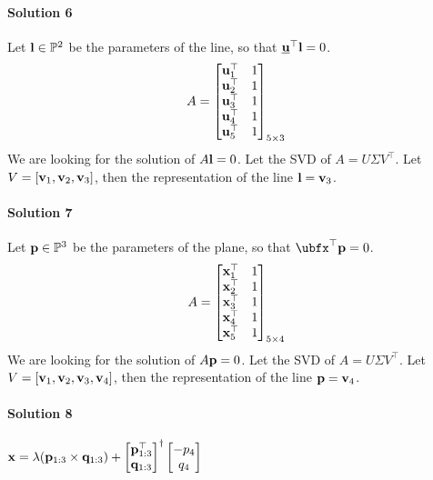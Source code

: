 \documentclass{article}
\begin{document}
\paragraph*{Solution 6}
Let $\mathbf{l} \in \mathbb{P}^2$  be the parameters of the line, so that $\underline{\mathbf{u}}^\top \mathbf{l} = 0$.
\begin{align*}
  A = \begin{bmatrix}
    \mathbf{u}_1^\top & 1 \\
    \mathbf{u}_2^\top & 1\\
    \mathbf{u}_3^\top & 1\\
    \mathbf{u}_4^\top & 1\\
    \mathbf{u}_5^\top & 1
    \end{bmatrix}_{5 \times 3}
\end{align*}
We are looking for the solution of $A \mathbf{l} = 0$.
Let the SVD of $A = U\Sigma V^\top$. Let $V = [\mathbf{v}_1, \mathbf{v}_2, \mathbf{v}_3]$, then
the representation of the line $\mathbf{l} = \mathbf{v}_3$.

\paragraph*{Solution 7}

Let $\mathbf{p} \in \mathbb{P}^3$  be the parameters of the plane, so that $\ubfx^\top \bfp = 0$.
\begin{align*}
  A = \begin{bmatrix}
    \mathbf{x}_1^\top & 1 \\
    \mathbf{x}_2^\top & 1\\
    \mathbf{x}_3^\top & 1\\
    \mathbf{x}_4^\top & 1\\
    \mathbf{x}_5^\top & 1
  \end{bmatrix}_{5 \times 4}
\end{align*}
We are looking for the solution of $A \mathbf{p} = 0$.
Let the SVD of $A = U\Sigma V^\top$. Let $V = [\mathbf{v}_1, \mathbf{v}_2, \mathbf{v}_3, \mathbf{v}_4]$, then
the representation of the line $\mathbf{p} = \mathbf{v}_4$.
\paragraph*{Solution 8}
$\mathbf{x} = \lambda (\mathbf{p}_{1:3} \times \mathbf{q}_{1:3}) + \begin{bmatrix} \mathbf{p}_{1:3}^\top
  \\ \mathbf{q}_{1:3}\end{bmatrix}^\dagger \begin{bmatrix}-p_4 \\ q_4 \end{bmatrix}$
\end{document}
